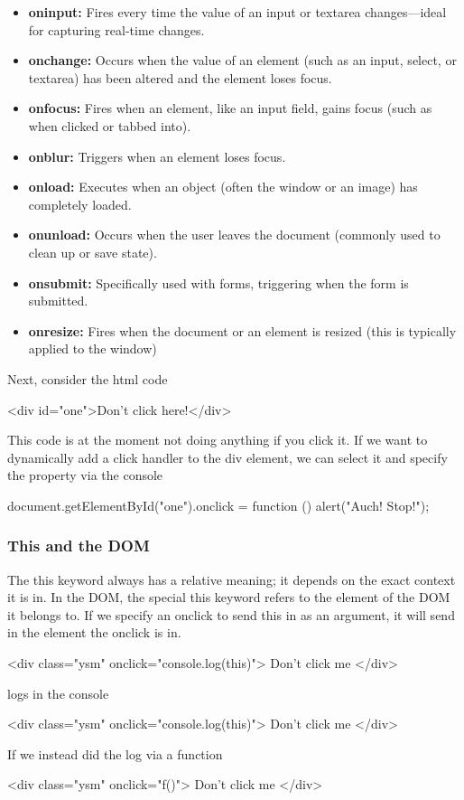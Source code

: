 \documentclass{report}
\begin{document}
\begin{jscode}
\begin{itemize}
    \item \textbf{oninput:} Fires every time the value of an input or textarea changes—ideal for capturing real-time changes.
    \item \textbf{onchange:} Occurs when the value of an element (such as an input, select, or textarea) has been altered and the element loses focus.
    \item \textbf{onfocus:} Fires when an element, like an input field, gains focus (such as when clicked or tabbed into).
    \item \textbf{onblur:} Triggers when an element loses focus.
    \item \textbf{onload:} Executes when an object (often the window or an image) has completely loaded.
    \item \textbf{onunload:} Occurs when the user leaves the document (commonly used to clean up or save state).
    \item \textbf{onsubmit:} Specifically used with forms, triggering when the form is submitted.
    \item \textbf{onresize:} Fires when the document or an element is resized (this is typically applied to the window)
\end{itemize}

\bigbreak \noindent 
Next, consider the html code
\bigbreak \noindent 
\begin{htmlcode}
 <div id="one">Don't click here!</div>
\end{htmlcode}
\bigbreak \noindent 
This code is at the moment not doing anything if you click it. If we want to
dynamically add a click handler to the div element, we can select it and specify the
property via the console
\bigbreak \noindent 
\begin{jscode}
    document.getElementById("one").onclick = function () {
        alert("Auch! Stop!");
    }
\end{jscode}

\bigbreak \noindent 
\subsubsection{This and the DOM}
\bigbreak \noindent 
The this keyword always has a relative meaning; it depends on the exact context
it is in. In the DOM, the special this keyword refers to the element of the DOM it
belongs to. If we specify an onclick to send this in as an argument, it will send in
the element the onclick is in.
\bigbreak \noindent 
\begin{jscode}
    <div class="ysm" onclick="console.log(this)"> Don't click me </div>
\end{jscode}
\bigbreak \noindent 
logs in the console
\bigbreak \noindent 
\begin{jscode}
    <div class="ysm" onclick="console.log(this)"> Don't click me </div>
\end{jscode}
\bigbreak \noindent 
If we instead did the log via a function
\bigbreak \noindent 
\begin{jscode}
    <div class="ysm" onclick="f()"> Don't click me </div>


\end{jscode}
\end{jscode}
\end{document}
